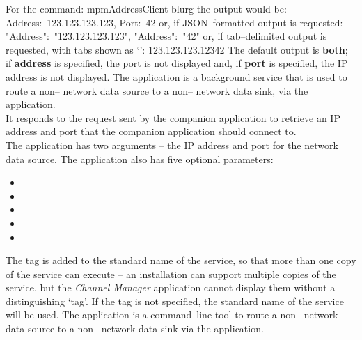 For the command:
\outputBegin{}
mpmAddressClient blurg
\outputEnd{}
the output would be:
\outputBegin{}
Address:\ 123.123.123.123, Port:\ 42
\outputEnd{}
or, if JSON--formatted output is requested:
\outputBegin{}
\textbraceleft{} "Address":\ "123.123.123.123", "Address":\ "42" \textbraceright{}
\outputEnd{}
or, if tab--delimited output is requested, with tabs shown as `\tabSymbol':
\outputBegin{}
123.123.123.123\pseudotab{}42
\outputEnd{}
The default output is \textbf{both}; if \textbf{address} is specified, the port is not
displayed and, if \textbf{port} is specified, the IP address is not displayed.
The  application is a background service that is used to
route a non--\yarp{} network data source to a non--\yarp{} network data sink, via the
 application.\\

It responds to the  request sent by the
companion application  to retrieve an IP address and port
that the companion application should connect to.\\

The application has two arguments -- the IP address and port for the network data source.
The application also has five optional parameters:
\begin{itemize}
\item {}
\item {}
\item {}
\item {}
\item {}
\end{itemize}
The tag is added to the standard name of the service, so that more than one copy of the
service can execute -- an \mplusm{} installation can support multiple copies of the
 service, but the \emph{Channel Manager} application cannot
display them without a distinguishing `tag'.
If the tag is not specified, the standard name of the service will be used.
The  application is a command--line tool to route a
non--\yarp{} network data source to a non--\yarp{} network data sink via the
 application.\\

